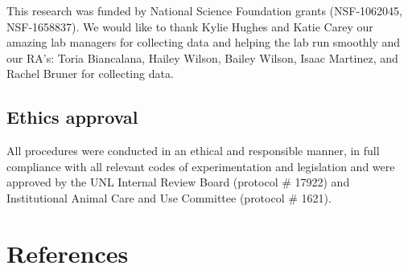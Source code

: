 \documentclass[
  english,
  ,doc,floatsintext]{apa6}
\begin{document}
This research was funded by National Science Foundation grants (NSF-1062045,
NSF-1658837). We would like to thank Kylie Hughes and Katie Carey our amazing lab managers for collecting data and helping the lab run smoothly and our RA's: Toria Biancalana, Hailey Wilson, Bailey Wilson, Isaac Martinez, and Rachel Bruner for collecting data.

\hypertarget{ethics-approval}{%
\subsection{Ethics approval}\label{ethics-approval}}

All procedures were conducted in an ethical and responsible manner, in full compliance with all relevant codes of experimentation and legislation and were approved by the UNL Internal Review Board (protocol \# 17922) and Institutional Animal Care and Use Committee (protocol \# 1621).

\newpage

\hypertarget{references}{%
\section{References}\label{references}}
\end{document}
